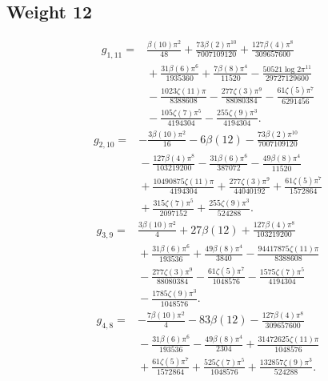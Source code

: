 \subsection*{Weight 12}
\begin{align*}g_{1,11}={}&\frac{\beta(10) \pi^{2}}{48}+\frac{73 \beta(2) \pi^{10}}{7007109120}+\frac{127 \beta(4) \pi^{8}}{309657600}\\
&{}+\frac{31 \beta(6) \pi^{6}}{1935360}+\frac{7 \beta(8) \pi^{4}}{11520}- \frac{50521 \log 2 \pi^{11}}{29727129600}\\
&{}- \frac{1023 \zeta(11) \pi}{8388608}- \frac{277 \zeta(3) \pi^{9}}{88080384}- \frac{61 \zeta(5) \pi^{7}}{6291456}\\
&{}- \frac{105 \zeta(7) \pi^{5}}{4194304}- \frac{255 \zeta(9) \pi^{3}}{4194304}.\end{align*}
\begin{align*}g_{2,10}={}&- \frac{3 \beta(10) \pi^{2}}{16}- 6 \beta(12)- \frac{73 \beta(2) \pi^{10}}{7007109120}\\
&{}- \frac{127 \beta(4) \pi^{8}}{103219200}- \frac{31 \beta(6) \pi^{6}}{387072}- \frac{49 \beta(8) \pi^{4}}{11520}\\
&{}+\frac{10490875 \zeta(11) \pi}{4194304}+\frac{277 \zeta(3) \pi^{9}}{44040192}+\frac{61 \zeta(5) \pi^{7}}{1572864}\\
&{}+\frac{315 \zeta(7) \pi^{5}}{2097152}+\frac{255 \zeta(9) \pi^{3}}{524288}.\end{align*}
\begin{align*}g_{3,9}={}&\frac{3 \beta(10) \pi^{2}}{4}+27 \beta(12)+\frac{127 \beta(4) \pi^{8}}{103219200}\\
&{}+\frac{31 \beta(6) \pi^{6}}{193536}+\frac{49 \beta(8) \pi^{4}}{3840}- \frac{94417875 \zeta(11) \pi}{8388608}\\
&{}- \frac{277 \zeta(3) \pi^{9}}{88080384}- \frac{61 \zeta(5) \pi^{7}}{1048576}- \frac{1575 \zeta(7) \pi^{5}}{4194304}\\
&{}- \frac{1785 \zeta(9) \pi^{3}}{1048576}.\end{align*}
\begin{align*}g_{4,8}={}&- \frac{7 \beta(10) \pi^{2}}{4}- 83 \beta(12)- \frac{127 \beta(4) \pi^{8}}{309657600}\\
&{}- \frac{31 \beta(6) \pi^{6}}{193536}- \frac{49 \beta(8) \pi^{4}}{2304}+\frac{31472625 \zeta(11) \pi}{1048576}\\
&{}+\frac{61 \zeta(5) \pi^{7}}{1572864}+\frac{525 \zeta(7) \pi^{5}}{1048576}+\frac{132857 \zeta(9) \pi^{3}}{524288}.\end{align*}
